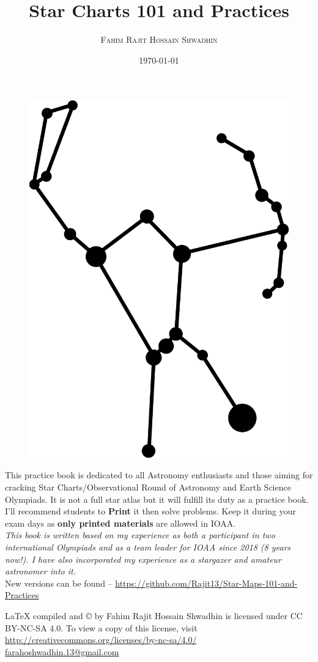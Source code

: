 \documentclass[a4paper,12pt]{extarticle}
\title{{\fontsize{30}{30}\selectfont\textbf{ \color{RoyalBlue} Star Charts 101 and Practices}}}
\author{\textsc{Fahim Rajit Hossain Shwadhin}}
\date{\today}
\begin{document}
\begin{titlepage}
	\maketitle
	
	
\begin{figure}[H]
    \centering
    \includegraphics[width=0.35 \linewidth]{ori_1.eps}
\end{figure}
	
\vspace{1cm}
This practice book is dedicated to all Astronomy enthusiasts and those aiming for cracking Star Charts/Observational Round of Astronomy and Earth Science Olympiads. It is not a full star atlas but it will fulfill its duty as a practice book. I'll recommend students to \textbf{Print} it then solve problems. Keep it during your exam days as \textbf{only printed materials} are allowed in IOAA. \\

\textit{This book is written based on my experience as both a participant in two international Olympiads and as a team leader for IOAA since 2018 (8 years now!). I have also incorporated my experience as a stargazer and amateur astronomer into it.}\\

New versions can be found -- \url{https://github.com/Rajit13/Star-Maps-101-and-Practices}

\vfill{\LaTeX  \;  compiled and  \copyright {} by \textsf{Fahim Rajit Hossain Shwadhin} is licensed under CC BY-NC-SA 4.0. To view a copy of this license, visit \url{http://creativecommons.org/licenses/by-nc-sa/4.0/} }\\

\hfill \url{farahoshwadhin.13@gmail.com}
\end{titlepage}

\tableofcontents
\end{document}
